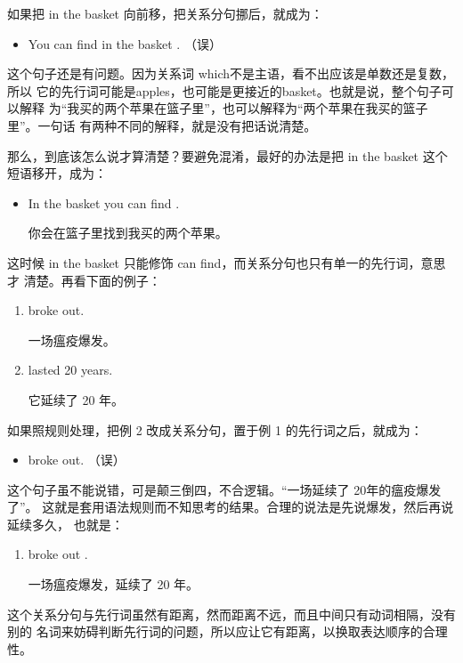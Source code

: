 如果把 in the basket 向前移，把关系分句挪后，就成为：
\begin{itemize}
\item You can find  in the basket
  . （误）
\end{itemize}
这个句子还是有问题。因为关系词 which不是主语，看不出应该是单数还是复数，所以
它的先行词可能是apples，也可能是更接近的basket。也就是说，整个句子可以解释
为“我买的两个苹果在篮子里”，也可以解释为“两个苹果在我买的篮子里”。一句话
有两种不同的解释，就是没有把话说清楚。

那么，到底该怎么说才算清楚？要避免混淆，最好的办法是把 in the basket
这个短语移开，成为：
\begin{itemize}
\item In the basket you can find  .

  你会在篮子里找到我买的两个苹果。
\end{itemize}
这时候 in the basket 只能修饰 can find，而关系分句也只有单一的先行词，意思才
清楚。再看下面的例子：
\begin{enumerate}
\item {} broke out.

  一场瘟疫爆发。
\item {} lasted 20 years.

  它延续了 20 年。
\end{enumerate}

如果照规则处理，把例 2 改成关系分句，置于例 1 的先行词之后，就成为：
\begin{itemize}
\item {}  broke out. （误）
\end{itemize}
这个句子虽不能说错，可是颠三倒四，不合逻辑。“一场延续了 20年的瘟疫爆发了”。
这就是套用语法规则而不知思考的结果。合理的说法是先说爆发，然后再说延续多久，
也就是：

\begin{enumerate}[resume]
\item {} broke out .

  一场瘟疫爆发，延续了 20 年。
\end{enumerate}
这个关系分句与先行词虽然有距离，然而距离不远，而且中间只有动词相隔，没有别的
名词来妨碍判断先行词的问题，所以应让它有距离，以换取表达顺序的合理性。

